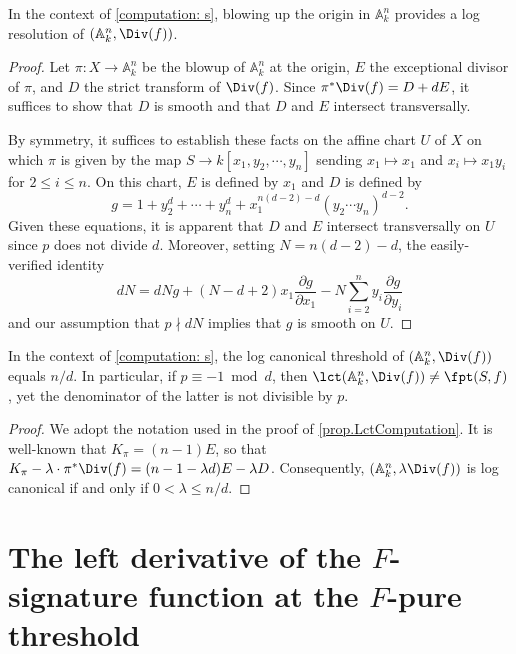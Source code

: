 \documentclass[11pt]{amsart}
\begin{document}
\begin{proposition}
\label{prop.LctComputation}  In the context of \autoref{computation: s}, blowing up the origin in $\mathbb{A}^n_k$ provides a log resolution of $(\mathbb{A}^n_k, \Div(f))$.
\end{proposition}
\begin{proof}  Let $\pi: X  \to \mathbb{A}^n_k$ be the blowup of $\mathbb{A}^n_k$ at the origin, $E$ the exceptional divisor of $\pi$, and $D$ the strict transform of $\Div(f)$.  Since $\pi^{\ast} \Div(f) = D + dE$, it suffices to show that $D$ is smooth and that $D$ and $E$ intersect transversally.

By symmetry, it suffices to establish these facts on the affine chart $U$ of $X$ on which $\pi$ is given by the map $S \to k[x_1, y_2, \cdots, y_n]$ sending $x_1 \mapsto x_1$ and $x_i \mapsto x_1 y_i$ for $2 \leq i \leq n$.  On this chart, $E$ is defined by $x_1$ and $D$ is defined by
\[ g = 1 + y_2^d + \cdots + y_n^d + x_1^{n(d-2) - d} (y_2 \cdots y_n)^{d-2}.\]
Given these equations,  it is apparent that $D$ and $E$ intersect transversally on $U$ since $p$ does not divide $d$.  Moreover, setting $N = n(d-2)-d$, the easily-verified identity
\[ d N = d N g + (N-d+2) x_1 \frac{\partial g}{\partial x_1} - N \sum_{i=2}^n y_i \frac{\partial g}{\partial y_i}\]
and our assumption that $p \nmid dN$ implies that $g$ is smooth on $U$.
\end{proof}

\begin{corollary}
\label{cor.LCTComputed}  In the context of \autoref{computation: s}, the log canonical threshold of $(\mathbb{A}^n_k, \Div(f))$ equals $n/d$.  In particular, if $p \equiv -1 \bmod d$, then $\lct(\mathbb{A}^n_k, \Div(f)) \neq \fpt(S, f)$, yet the denominator of the latter is not divisible by $p$.
\end{corollary}

\begin{proof}  We adopt the notation used in the proof of \autoref{prop.LctComputation}.  It is well-known that $K_{\pi} = (n-1)E$, so that  $K_{\pi} - \lambda \cdot \pi^{\ast} \Div(f) = (n-1-\lambda d) E  - \lambda D$.  Consequently,  $(\mathbb{A}^n_k, \lambda \Div(f))$ is log canonical if and only if $0 < \lambda \leq n/d$.
\end{proof}

\section{The left derivative of the $F$-signature function at the $F$-pure threshold}
\end{document}
